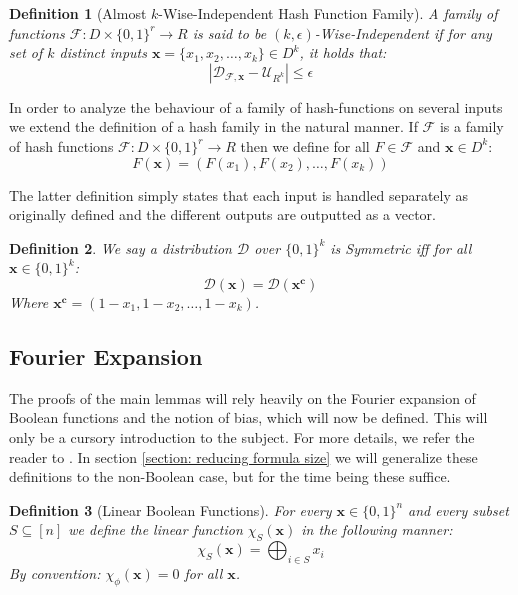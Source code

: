 \documentclass[12pt]{article}
\newtheorem{definition}{Definition}[section]
\newcommand{\zo}[1]{\{0,1\}^{#1}}
\newcommand{\dist}{\mathcal{D}}
\newcommand{\F}{\mathcal{F}}
\newcommand{\abs}[1]{\left| #1 \right|}
\renewcommand{\vec}[1]{\bm{#1}}
\begin{document}
	\begin{definition}[Almost $k$-Wise-Independent Hash Function Family]
		A family of functions \break $\F : D \times \zo{r} \rightarrow R$ is said to be $(k,\epsilon)$\emph{-Wise-Independent} if
		for any set of $k$ \emph{distinct} inputs $\vec{x} = \{x_1,x_2,\dots,x_k\} \in D^k$, it holds that:
		\[
			\abs{ \dist_{\F,\vec{x}} - \mathcal{U}_{R^k} } \leq \epsilon
		\]
		
	\end{definition}
	
	In order to analyze the behaviour of a family of hash-functions on several inputs we extend the definition of a hash family in the natural manner.
	If $\F$ is a family of hash functions $\F : D \times \zo{r} \rightarrow R$ then we define for all $F \in \F$ and $\vec{x} \in D^k$:
	\begin{equation*}
		F(\vec{x}) = \left(F(x_1), F(x_2), \dots, F(x_k) \right)
	\end{equation*}
	
	The latter definition simply states that each input is handled separately as originally defined and the different outputs are outputted as a vector.
	
	\begin{definition} \label{Def: Symmetric distribution}
		We say a distribution $\dist$ over $\zo{k}$ is \emph{Symmetric} iff for all $\vec{x} \in \zo{k}$:
		\begin{equation*}
			\dist(\vec{x}) = \dist(\vec{x^c})
		\end{equation*}
		Where $\vec{x^c} = (1-x_1, 1-x_2, \dots, 1-x_k)$.
	\end{definition}
	
	\subsection{Fourier Expansion}
	
	The proofs of the main lemmas will rely heavily on the Fourier expansion of Boolean functions and the notion of bias, which will now be defined.
	This will only be a cursory introduction to the subject.
	For more details, we refer the reader to \cite{AnalysisOfBooleanFunctions}.
	In section \ref{section: reducing formula size} we will generalize these definitions to the non-Boolean case, but for the time being these suffice.
	
	\begin{definition}[Linear Boolean Functions]
		For every $\vec{x} \in \zo{n}$ and every subset $S \subseteq \left[n\right]$ we define the linear function $\chi_S(\vec{x})$ in the following manner:
		\begin{equation*}
			\chi_S(\vec{x}) = \bigoplus_{i \in S} x_i
		\end{equation*}	
		By convention: $\chi_\phi(\vec{x}) = 0$ for all $\vec{x}$.
	\end{definition}
	
\end{document}
